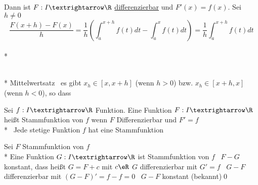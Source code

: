 Dann ist $F:I→\R$ \ul{differenzierbar} und $F'(x)=f(x)$.
\bew
Sei $h≠0$ $$\frac{F(x+h)-F(x)}{h}=\frac{1}{h}\left(\int_a^{x+h}f(t)dt-\int_a^xf(t)dt\right)=\frac{1}{h}\int_a^{x+h}f(t)dt$$\\*
\\*
Mittelwertsatz \Rarr\ es gibt $x_h\in[x,x+h]$ (wenn $h>0$) bzw. $x_h\in[x+h,x]$ (wenn $h<0$), so dass

Sei $f:I→\R$ Funktion. Eine Funktion $F:I→\R$ heißt Stammfunktion von $f$ wenn $F$ Differenzierbar und $F'=f$\\*
 \Rarr\ Jede stetige Funktion $f$ hat eine Stammfunktion

Sei $F$ Stammfunktion von $f$\\*
Eine Funktion $G:I→\R$ ist Stammfunktion von $f$ \equ\ $F-G$ konstant, dass heißt $G=F+c$ mit $c\eR$
\bew
$G$ differenzierbar mit $G'=f$ \equ\ $G-F$ differenzierbar mit $(G-F)'=f-f=0$ \equ\ $G-F$ konstant (bekannt)\qed

